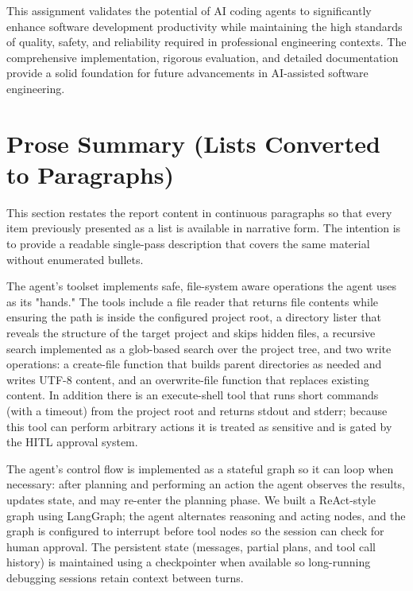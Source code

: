 \documentclass[12pt, a4paper]{article}
\begin{document}
This assignment validates the potential of AI coding agents to significantly enhance software development productivity while maintaining the high standards of quality, safety, and reliability required in professional engineering contexts. The comprehensive implementation, rigorous evaluation, and detailed documentation provide a solid foundation for future advancements in AI-assisted software engineering.

\newpage
\section{Prose Summary (Lists Converted to Paragraphs)}
This section restates the report content in continuous paragraphs so that every item previously presented as a list is available in narrative form. The intention is to provide a readable single-pass description that covers the same material without enumerated bullets.

The agent's toolset implements safe, file-system aware operations the agent uses as its "hands." The tools include a file reader that returns file contents while ensuring the path is inside the configured project root, a directory lister that reveals the structure of the target project and skips hidden files, a recursive search implemented as a glob-based search over the project tree, and two write operations: a create-file function that builds parent directories as needed and writes UTF-8 content, and an overwrite-file function that replaces existing content. In addition there is an execute-shell tool that runs short commands (with a timeout) from the project root and returns stdout and stderr; because this tool can perform arbitrary actions it is treated as sensitive and is gated by the HITL approval system.

The agent's control flow is implemented as a stateful graph so it can loop when necessary: after planning and performing an action the agent observes the results, updates state, and may re-enter the planning phase. We built a ReAct-style graph using LangGraph; the agent alternates reasoning and acting nodes, and the graph is configured to interrupt before tool nodes so the session can check for human approval. The persistent state (messages, partial plans, and tool call history) is maintained using a checkpointer when available so long-running debugging sessions retain context between turns.
\end{document}
